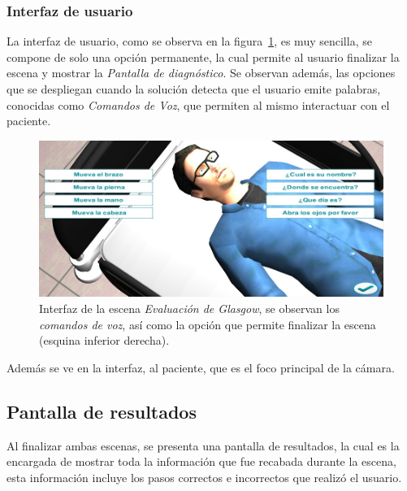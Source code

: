 
\subsubsection{Interfaz de usuario}

La interfaz de usuario, como se observa en la figura~\ref{fig:glasgow_gui}, es
muy sencilla, se compone de solo una opción permanente, la cual permite al
usuario finalizar la escena y mostrar la \emph{Pantalla de diagnóstico}. Se
observan además, las opciones que se despliegan cuando la solución detecta que
el usuario emite palabras, conocidas como \emph{Comandos de Voz}, que permiten
al mismo interactuar con el paciente.

\begin{figure}[H]
\centering
\includegraphics[scale=0.5]{solucion/images/glasgow_comandos_voz.jpg}
\caption{Interfaz de la escena \emph{Evaluación de Glasgow}, se observan los
    \emph{comandos de voz}, así como la opción que permite finalizar la escena
    (esquina inferior derecha).}
\label{fig:glasgow_gui}
\end{figure}

Además se ve en la interfaz, al paciente, que es el foco principal de la cámara.

\subsection{Pantalla de resultados}

Al finalizar ambas escenas, se presenta una pantalla de resultados, la cual es
la encargada de mostrar toda la información que fue recabada durante la escena,
esta información incluye los pasos correctos e incorrectos que realizó el
usuario.


